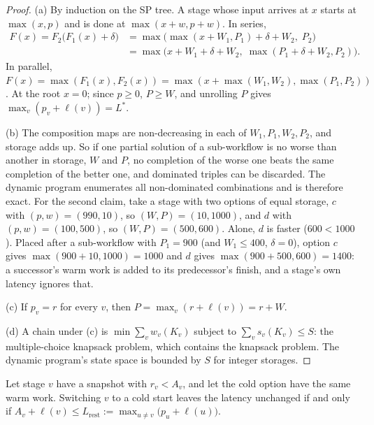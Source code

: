 \begin{proof}
(a) By induction on the SP tree. A stage whose input arrives at $x$ starts at $\max(x, p)$ and
is done at $\max(x + w, p + w)$. In series,
\begin{align*}
  F(x) = F_2\bigl(F_1(x) + \delta\bigr)
       &= \max\bigl(\max(x + W_1, P_1) + \delta + W_2,\; P_2\bigr) \\
       &= \max\bigl(x + W_1 + \delta + W_2,\; \max(P_1 + \delta + W_2, P_2)\bigr).
\end{align*}
In parallel, $F(x) = \max(F_1(x), F_2(x)) = \max(x + \max(W_1, W_2), \max(P_1, P_2))$. At the
root $x = 0$; since $p \ge 0$, $P \ge W$, and unrolling $P$ gives $\max_v (p_v + \ell(v)) = L^*$.

(b) The composition maps are non-decreasing in each of $W_1, P_1, W_2, P_2$, and storage adds
up. So if one partial solution of a sub-workflow is no worse than another in storage, $W$ and
$P$, no completion of the worse one beats the same completion of the better one, and dominated
triples can be discarded. The dynamic program enumerates all non-dominated combinations and is
therefore exact. For the second claim, take a stage with two options of equal storage,
$c$ with $(p, w) = (990, 10)$, so $(W, P) = (10, 1000)$, and $d$ with $(p, w) = (100, 500)$,
so $(W, P) = (500, 600)$. Alone, $d$ is faster ($600 < 1000$). Placed after a sub-workflow with
$P_1 = 900$ (and $W_1 \le 400$, $\delta = 0$), option $c$ gives $\max(900 + 10, 1000) = 1000$
and $d$ gives $\max(900 + 500, 600) = 1400$: a successor's warm work is added to its
predecessor's finish, and a stage's own latency ignores that.

(c) If $p_v = r$ for every $v$, then $P = \max_v (r + \ell(v)) = r + W$.

(d) A chain under (c) is $\min \sum_v w_v(K_v)$ subject to $\sum_v s_v(K_v) \le S$: the
multiple-choice knapsack problem, which contains the knapsack problem. The dynamic program's
state space is bounded by $S$ for integer storages.
\end{proof}

\begin{corollary}
\label{cor:hidden}
Let stage $v$ have a snapshot with $r_v < A_v$, and let the cold option have the same warm work.
Switching $v$ to a cold start leaves the latency unchanged if and only if
$A_v + \ell(v) \le L_{\mathrm{rest}} := \max_{u \ne v} \bigl(p_u + \ell(u)\bigr)$.
\end{corollary}

